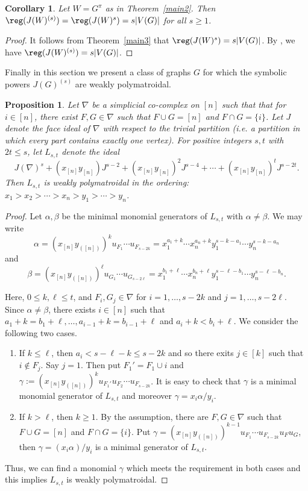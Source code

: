 \documentclass[12pt]{amsart}
\newtheorem{Corollary}[Theorem]{Corollary}
\newtheorem{Proposition}[Theorem]{Proposition}
\begin{document}
\begin{Corollary} Let $W=G^{\pi}$ as in Theorem~\ref{main2}. Then $\reg(J(W)^{(s)})=\reg(J(W)^{s})=s|V(G)|$  for all $s\geq 1$.
\end{Corollary}
\begin{proof} It follows from Theorem~\ref{main3} that $\reg(J(W)^{s})=s|V(G)|$.  By \cite[Corollary 4.4]{Sel}, we have $\reg(J(W)^{(s)})=s|V(G)|$.
\end{proof}

Finally in this section we present a class of  graphs $G$ for which the symbolic powers  $J(G)^{(s)}$ are weakly polymatroidal.

\begin{Proposition} \label{symbolic} Let $\nabla$ be  a simplicial co-complex on $[n]$ such that that for $i\in [n]$, there exist $F,G\in \nabla$ such that $F\cup G=[n]$ and $F\cap G=\{i\}$.  Let $J$ denote the face ideal of $\nabla$ with respect to the trivial partition (i.e. a partition in which every part contains exactly one vertex).  For positive integers $s,t$ with $2t\leq s$,  let $L_{s,t}$  denote the ideal $$J(\nabla)^s+(x_{[n]}y_{[n]})J^{s-2}+ (x_{[n]}y_{[n]})^2J^{s-4}+\cdots+(x_{[n]}y_{[n]})^tJ^{s-2t}.$$
 Then  $L_{s,t}$ is weakly polymatroidal in the  ordering: $x_1>x_2>\cdots>x_n>y_1>\cdots>y_n$.


\end{Proposition}

\begin{proof}  Let $\alpha,\beta$ be the minimal monomial generators of $L_{s,t}$ with $\alpha\neq \beta$. We may write $$\alpha=(x_{[n]}y_{([n])})^ku_{F_1}\cdots u_{F_{s-2k}}=x_1^{a_1+k}\cdots x_n^{a_n+k}y_1^{s-k-a_1}\cdots y_n^{s-k-a_n}$$ and
$$\beta=(x_{[n]}y_{([n])})^{\ell}u_{G_1}\cdots u_{G_{s-2\ell}}=x_1^{b_1+\ell}\cdots x_n^{b_n+\ell }y_1^{s-\ell-b_1}\cdots y_n^{s-
\ell-b_n}.$$

Here, $0\leq k,\ell\leq t$, and $F_i, G_j\in \nabla$ for $i=1,\ldots, s-2k$ and $j=1,\ldots,s-2\ell$. Since $\alpha\neq \beta$, there exists $i\in [n]$ such that $a_1+k=b_1+\ell,\ldots, a_{i-1}+k=b_{i-1}+\ell$ and $a_i+k<b_i+\ell$. We consider the following two cases.

\begin{enumerate}
  \item If $k\leq \ell$, then $a_i<s-\ell-k\leq s-2k$ and so  there exits $j\in [k]$ such that $i\notin F_j$. Say $j=1$.     Then  put $F_1'=F_1\cup {i}$ and $\gamma:=(x_{[n]}y_{([n])})^ku_{F_1'}u_{F_2}\cdots u_{F_{s-2k}}$. It is easy to check that $\gamma$ is a minimal monomial generator of $ L_{s,t}$ and moreover $\gamma=x_i\alpha/y_i$.

  \item If $k> \ell$, then $k\geq 1$. By the assumption, there are $F,G\in \nabla$ such that $F\cup G=[n]$ and $F\cap G=\{i\}$. Put $\gamma=(x_{[n]}y_{([n])})^{k-1}u_{F_1}\cdots u_{F_{s-2k}}u_Fu_G$, then $\gamma=(x_i\alpha)/y_i$ is a minimal generator of   $L_{s,t}$.

\end{enumerate}
Thus, we can find a monomial $\gamma$ which meets the requirement in both cases and this  implies $L_{s,t}$ is weakly polymatroidal.
 \end{proof}
\end{document}

